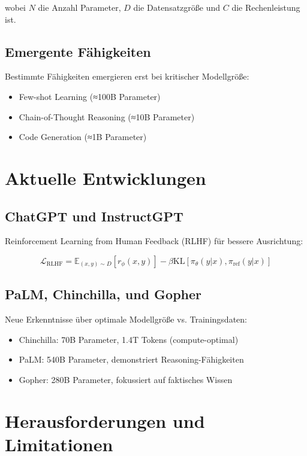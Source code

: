 wobei $N$ die Anzahl Parameter, $D$ die Datensatzgröße und $C$ die Rechenleistung ist.

\subsection{Emergente Fähigkeiten}

Bestimmte Fähigkeiten emergieren erst bei kritischer Modellgröße:
\begin{itemize}
    \item Few-shot Learning (≈100B Parameter)
    \item Chain-of-Thought Reasoning (≈10B Parameter)
    \item Code Generation (≈1B Parameter)
\end{itemize}

\section{Aktuelle Entwicklungen}

\subsection{ChatGPT und InstructGPT}

Reinforcement Learning from Human Feedback (RLHF) für bessere Ausrichtung:

\begin{equation}
\mathcal{L}_{\text{RLHF}} = \mathbb{E}_{(x,y) \sim D} [r_\phi(x,y)] - \beta \text{KL}[\pi_\theta(y|x), \pi_{\text{ref}}(y|x)]
\end{equation}

\subsection{PaLM, Chinchilla, und Gopher}

Neue Erkenntnisse über optimale Modellgröße vs. Trainingsdaten:
\begin{itemize}
    \item Chinchilla: 70B Parameter, 1.4T Tokens (compute-optimal)
    \item PaLM: 540B Parameter, demonstriert Reasoning-Fähigkeiten
    \item Gopher: 280B Parameter, fokussiert auf faktisches Wissen
\end{itemize}

\section{Herausforderungen und Limitationen}

